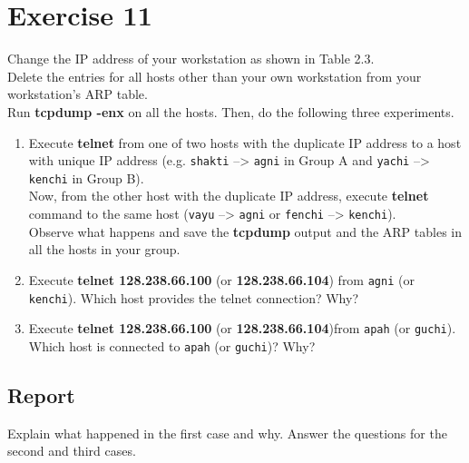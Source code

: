 \documentclass[10pt,a4paper]{article}
\numberwithin{equation}{section}
\numberwithin{figure}{section}
\numberwithin{table}{section}
\begin{document}
    \section{ Exercise 11}
    Change the IP address of your workstation as shown in Table 2.3. \\
    Delete the entries for all hosts other than your own workstation from your workstation’s ARP table. \\
    Run \textbf{tcpdump -enx} on all the hosts.
    Then, do the following three experiments. \\
    \begin{enumerate}
        \item Execute \textbf{telnet} from one of two hosts with the duplicate IP address to a host with unique IP address (e.g. \texttt{shakti} –> \texttt{agni} in Group A and \texttt{yachi} –> \texttt{kenchi} in Group B). \\
        Now, from the other host with the duplicate IP address, execute \textbf{telnet} command to the same host (\texttt{vayu} –> \texttt{agni} or \texttt{fenchi} –> \texttt{kenchi}). \\
        Observe what happens and save the \textbf{tcpdump} output and the ARP tables in all the hosts in your group.
        \item Execute \textbf{telnet 128.238.66.100} (or \textbf{128.238.66.104}) from \texttt{agni} (or \texttt{kenchi}).
        Which host provides the telnet connection?
        Why?
        \item Execute \textbf{telnet 128.238.66.100} (or \textbf{128.238.66.104})from \texttt{apah} (or \texttt{guchi}). Which host is connected to \texttt{apah} (or \texttt{guchi})? Why?
    \end{enumerate}
    \subsection*{Report}
    Explain what happened in the first case and why.
    Answer the questions for the second and third cases.
\end{document}
